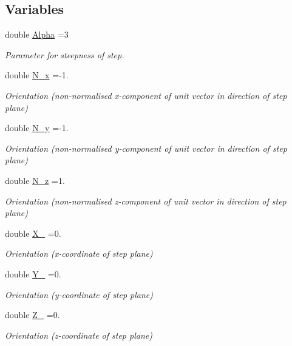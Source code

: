 \subsection*{Variables}
\begin{DoxyCompactItemize}
\item 
double \hyperlink{namespaceTanhSolnForPoisson_ae676ccd186d5df119cce811596d949c1}{Alpha} =3
\begin{DoxyCompactList}\small\item\em Parameter for steepness of step. \end{DoxyCompactList}\item 
double \hyperlink{namespaceTanhSolnForPoisson_ac3d25f0791c1363f487600e02757bc97}{N\+\_\+x} =-\/1.
\begin{DoxyCompactList}\small\item\em Orientation (non-\/normalised x-\/component of unit vector in direction of step plane) \end{DoxyCompactList}\item 
double \hyperlink{namespaceTanhSolnForPoisson_a482d668ef91071985d1f4ce7cf29a926}{N\+\_\+y} =-\/1.
\begin{DoxyCompactList}\small\item\em Orientation (non-\/normalised y-\/component of unit vector in direction of step plane) \end{DoxyCompactList}\item 
double \hyperlink{namespaceTanhSolnForPoisson_ae6b5b5d21747a45776004756dc97dc5c}{N\+\_\+z} =1.
\begin{DoxyCompactList}\small\item\em Orientation (non-\/normalised z-\/component of unit vector in direction of step plane) \end{DoxyCompactList}\item 
double \hyperlink{namespaceTanhSolnForPoisson_af55e0479c15ab58929eb96ee9d6cf07a}{X\+\_} =0.
\begin{DoxyCompactList}\small\item\em Orientation (x-\/coordinate of step plane) \end{DoxyCompactList}\item 
double \hyperlink{namespaceTanhSolnForPoisson_addc6dc6578b16a1d9aa774c25776b921}{Y\+\_} =0.
\begin{DoxyCompactList}\small\item\em Orientation (y-\/coordinate of step plane) \end{DoxyCompactList}\item 
double \hyperlink{namespaceTanhSolnForPoisson_abf4856ed1855c34c2b2ea57fd6783644}{Z\+\_} =0.
\begin{DoxyCompactList}\small\item\em Orientation (z-\/coordinate of step plane) \end{DoxyCompactList}\end{DoxyCompactItemize}


